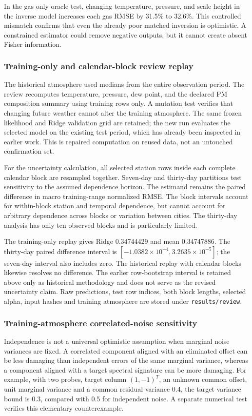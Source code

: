 \documentclass[conference]{IEEEtran}
\begin{document}
In the gas only oracle test, changing temperature, pressure, and scale height in the inverse model increases each gas RMSE by 31.5\% to 32.6\%. This controlled mismatch confirms that even the already poor matched inversion is optimistic. A constrained estimator could remove negative outputs, but it cannot create absent Fisher information.

\subsubsection{Training-only and calendar-block review replay}
The historical atmosphere used medians from the entire observation period. The review recomputes temperature, pressure, dew point, and the declared PM composition summary using training rows only. A mutation test verifies that changing future weather cannot alter the training atmosphere. The same frozen likelihood and Ridge validation grid are retained; the new run evaluates the selected model on the existing test period, which has already been inspected in earlier work. This is repaired computation on reused data, not an untouched confirmation set.

For the uncertainty calculation, all selected station rows inside each complete calendar block are resampled together. Seven-day and thirty-day partitions test sensitivity to the assumed dependence horizon. The estimand remains the paired difference in macro training-range normalized RMSE. The block intervals account for within-block station and temporal dependence, but cannot account for arbitrary dependence across blocks or variation between cities. The thirty-day analysis has only ten observed blocks and is particularly limited.

The training-only replay gives Ridge 0.34744429 and mean 0.34747886. The thirty-day paired difference interval is $[-1.0382\times10^{-4},3.2635\times10^{-5}]$; the seven-day interval also includes zero. The historical replay with calendar blocks likewise resolves no difference. The earlier row-bootstrap interval is retained above only as historical methodology and does not serve as the revised uncertainty claim. Raw predictions, test row indices, both block lengths, selected alpha, input hashes and training atmosphere are stored under \texttt{results/review}.

\subsubsection{Training-atmosphere correlated-noise sensitivity}
Independence is not a universal optimistic assumption when marginal noise variances are fixed. A correlated component aligned with an eliminated offset can be less damaging than independent errors of the same marginal variance, whereas a component aligned with a target spectral signature can be more damaging. For example, with two probes, target column $(1,-1)^T$, an unknown common offset, unit marginal variance and a common residual variance 0.4, the target variance bound is 0.3, compared with 0.5 for independent noise. A separate numerical test verifies this elementary counterexample.
\end{document}
